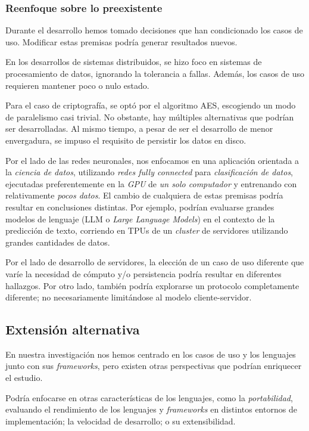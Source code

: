 \documentclass[11pt]{article}
\let\Oldsubsection\subsection
\renewcommand{\subsection}{\FloatBarrier\Oldsubsection}
\let\Oldsubsubsection\subsubsection
\renewcommand{\subsubsection}{\FloatBarrier\Oldsubsubsection}
\newcommand{\english}[1]{\textit{#1}}
\begin{document}
\subsubsection{Reenfoque sobre lo preexistente}

Durante el desarrollo hemos tomado decisiones que han condicionado los casos de uso. Modificar estas premisas podría generar resultados nuevos.

En los desarrollos de sistemas distribuidos, se hizo foco en sistemas de procesamiento de datos, ignorando la tolerancia a fallas. Además, los casos de uso requieren mantener poco o nulo estado.

Para el caso de criptografía, se optó por el algoritmo AES, escogiendo un modo de paralelismo casi trivial. No obstante, hay múltiples alternativas que podrían ser desarrolladas. Al mismo tiempo, a pesar de ser el desarrollo de menor envergadura, se impuso el requisito de persistir los datos en disco.

Por el lado de las redes neuronales, nos enfocamos en una aplicación orientada a la \textit{ciencia de datos}, utilizando \textit{redes fully connected} para \textit{clasificación de datos}, ejecutadas preferentemente en la \textit{GPU} de \textit{un solo computador} y entrenando con relativamente \textit{pocos datos}. El cambio de cualquiera de estas premisas podría resultar en conclusiones distintas. Por ejemplo, podrían evaluarse grandes modelos de lenguaje (LLM o \english{Large Language Models}) en el contexto de la predicción de texto, corriendo en TPUs de un \english{cluster} de servidores utilizando grandes cantidades de datos.

Por el lado de desarrollo de servidores, la elección de un caso de uso diferente que varíe la necesidad de cómputo y/o persistencia podría resultar en diferentes hallazgos. Por otro lado, también podría explorarse un protocolo completamente diferente; no necesariamente limitándose al modelo cliente-servidor.

\subsection{Extensión alternativa}

En nuestra investigación nos hemos centrado en los casos de uso y los lenguajes junto con sus \english{frameworks}, pero existen otras perspectivas que podrían enriquecer el estudio.

Podría enfocarse en otras características de los lenguajes, como la \textit{portabilidad}, evaluando el rendimiento de los lenguajes y \english{frameworks} en distintos entornos de implementación; la velocidad de desarrollo; o su extensibilidad.
\end{document}
